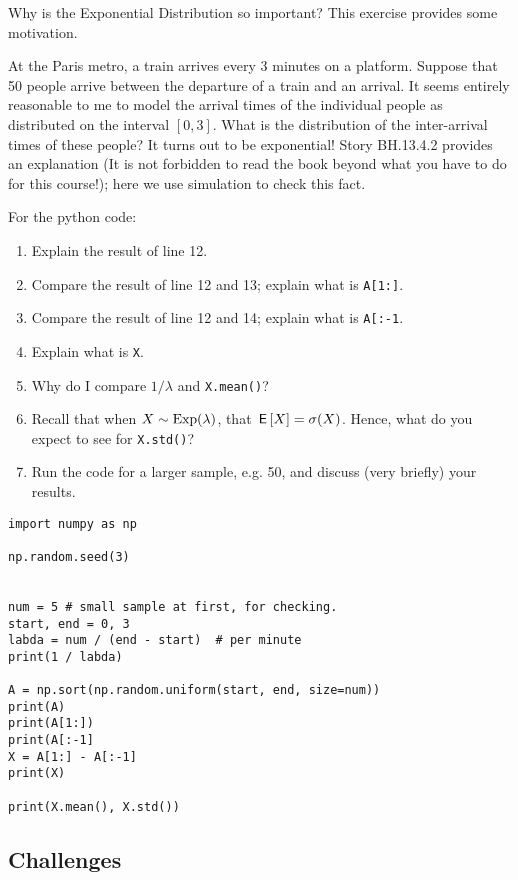\documentclass[assignments]{subfiles}
\begin{document}
\begin{exercise}
Why is the Exponential Distribution so important? This exercise provides some motivation.


At the Paris metro, a  train arrives every  3  minutes on a platform. Suppose that 50 people arrive between the departure of a train and an arrival.
It seems entirely reasonable to me to model the arrival times of the individual people as distributed on the interval \([0,3]\).
What is the distribution of the inter-arrival times of these people? It turns out to be exponential!  Story BH.13.4.2 provides an explanation (It is not forbidden to read the book beyond what you have to do for this course!); here we use simulation to check this fact. 

For the python code:
\begin{enumerate}
\item Explain the result of line 12.
\item Compare the result of  line 12 and 13;  explain what is \texttt{A[1:]}.
\item Compare the result of  line 12 and 14;  explain what is \texttt{A[:-1}.
\item Explain what is \texttt{X}.
\item Why do I compare $1/\lambda$ and \texttt{X.mean()}?
\item Recall that when $X\sim \mathrm{Exp}(\lambda)$, that $\,\mathsf{E}\left[X\right] = \sigma (X)$. Hence, what do you expect to see for  \texttt{X.std()}?
\item Run the code for a larger sample, e.g. 50, and discuss (very briefly) your results.
\end{enumerate}


\begin{verbatim}
import numpy as np

np.random.seed(3)


num = 5 # small sample at first, for checking.
start, end = 0, 3
labda = num / (end - start)  # per minute
print(1 / labda)

A = np.sort(np.random.uniform(start, end, size=num))
print(A)
print(A[1:])
print(A[:-1]
X = A[1:] - A[:-1]
print(X)

print(X.mean(), X.std())
\end{verbatim}

\end{exercise}


\subsection{Challenges}
\label{sec:challenges}
\end{document}
